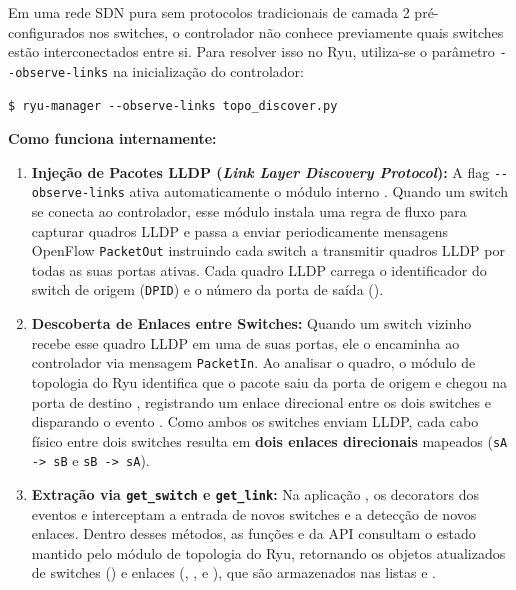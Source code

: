 \documentclass[12pt,a4paper]{article}
\begin{document}
Em uma rede SDN pura sem protocolos tradicionais de camada 2 pré-configurados nos switches, o controlador não conhece previamente quais switches estão interconectados entre si. Para resolver isso no Ryu, utiliza-se o parâmetro \texttt{{-}{-}observe-links} na inicialização do controlador:

\begin{lstlisting}
$ ryu-manager --observe-links topo_discover.py
\end{lstlisting}

\textbf{Como funciona internamente:}
\begin{enumerate}
    \item \textbf{Injeção de Pacotes LLDP (\textit{Link Layer Discovery Protocol}):} A flag \texttt{{-}{-}observe-links} ativa automaticamente o módulo interno . Quando um switch se conecta ao controlador, esse módulo instala uma regra de fluxo para capturar quadros LLDP e passa a enviar periodicamente mensagens OpenFlow \texttt{PacketOut} instruindo cada switch a transmitir quadros LLDP por todas as suas portas ativas. Cada quadro LLDP carrega o identificador do switch de origem (\texttt{DPID}) e o número da porta de saída ().
    \item \textbf{Descoberta de Enlaces entre Switches:} Quando um switch vizinho recebe esse quadro LLDP em uma de suas portas, ele o encaminha ao controlador via mensagem \texttt{PacketIn}. Ao analisar o quadro, o módulo de topologia do Ryu identifica que o pacote saiu da porta de origem  e chegou na porta de destino , registrando um enlace direcional entre os dois switches e disparando o evento . Como ambos os switches enviam LLDP, cada cabo físico entre dois switches resulta em \textbf{dois enlaces direcionais} mapeados (\texttt{sA -> sB} e \texttt{sB -> sA}).
    \item \textbf{Extração via \texttt{get\_switch} e \texttt{get\_link}:} Na aplicação , os decorators dos eventos  e  interceptam a entrada de novos switches e a detecção de novos enlaces. Dentro desses métodos, as funções  e  da API  consultam o estado mantido pelo módulo de topologia do Ryu, retornando os objetos atualizados de switches () e enlaces (, ,  e ), que são armazenados nas listas  e .
\end{enumerate}
\end{document}
